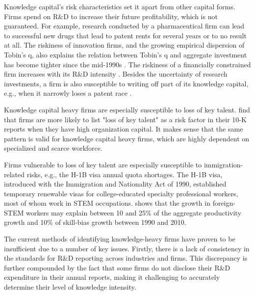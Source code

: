 \documentclass[12pt, letterpaper]{article}
\begin{document}
Knowledge capital's risk characteristics set it apart from other capital forms. Firms spend on R\&D to increase their future profitability, which is not guaranteed. For example, research conducted by a pharmaceutical firm can lead to successful new drugs that lead to patent rents for several years or to no result at all. The riskiness of innovation firms, and the growing empirical dispersion of Tobin's q, also explains the relation between Tobin's q and aggregate investment has become tighter since the mid-1990s \citep{Andrei2019-bh}. The riskiness of a financially constrained firm increases with its R\&D intensity \citep{Li2011-ay}. Besides the uncertainty of research investments, a firm is also susceptible to writing off part of its knowledge capital, e.g., when it narrowly loses a patent race \citep{Peters2017-fl}.

Knowledge capital heavy firms are especially susceptible to loss of key talent. \cite{Eisfeldt2013-ad} find that firms are more likely to list "loss of key talent" as a risk factor in their 10-K reports when they have high organization capital. It makes sense that the same pattern is valid for knowledge capital heavy firms, which are highly dependent on specialized and scarce workforce.

Firms vulnerable to loss of key talent are especially susceptible to immigration-related risks, e.g., the H-1B visa annual quota shortages. The H-1B visa, introduced with the Immigration and Nationality Act of 1990, established temporary renewable visas for college-educated specialty professional workers, most of whom work in STEM occupations. \cite{Peri2015-qt} shows that the growth in foreign-STEM workers may explain between 10 and 25\% of the aggregate productivity growth and 10\% of skill-bias growth between 1990 and 2010.


The current methods of identifying knowledge-heavy firms have proven to be insufficient due to a number of key issues. Firstly, there is a lack of consistency in the standards for R\&D reporting across industries and firms. This discrepancy is further compounded by the fact that some firms do not disclose their R\&D expenditure in their annual reports, making it challenging to accurately determine their level of knowledge intensity.
\end{document}
